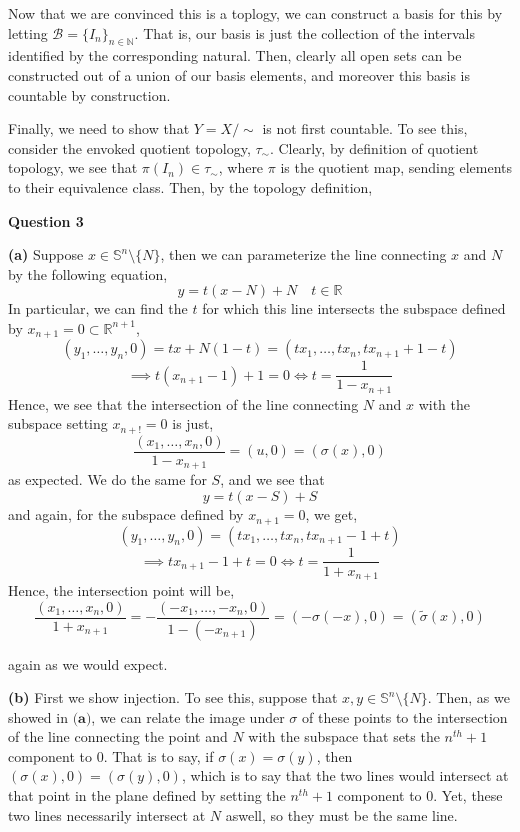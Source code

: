 \documentclass[10pt]{article}
\newcommand{\R}{\mathbb{R}}
\newcommand{\N}{\mathbb{N}}
\newcommand{\Sp}{\mathbb{S}}
\begin{document}
Now that we are convinced this is a toplogy, we can construct a basis for this by letting $\mathcal{B} = \{I_{n}\}_{n\in \N}$. That is, our basis is just the collection of the intervals identified by the corresponding natural. Then, clearly all open sets can be constructed out of a union of our basis elements, and moreover this basis is countable by construction.

Finally, we need to show that $Y = X/\sim$ is not first countable. To see this, consider the envoked quotient topology, $\tau_{\sim}$. Clearly, by definition of quotient topology, we see that $\pi (I_{n}) \in \tau_{\sim}$, where $\pi$ is the quotient map, sending elements to their equivalence class. Then, by the topology definition, 
\newpage

\textbf{Question 3}

\textbf{(a)} Suppose $x\in \Sp^{n}\setminus \{N\}$, then we can parameterize the line connecting $x$ and $N$ by the following equation,
$$y = t(x-N)+ N \hspace{1em} t\in \R$$
In particular, we can find the $t$ for which this line intersects the subspace defined by $x_{n+1} = 0 \subset \R^{n+1}$,
$$(y_{1}, \dots, y_{n}, 0) = tx + N(1-t) = (tx_{1}, \dots, tx_{n}, tx_{n+1} + 1 - t)$$
$$ \implies t(x_{n+1} - 1) + 1 = 0 \iff t = \frac{1}{1-x_{n+1}}$$
Hence, we see that the intersection of the line connecting $N$ and $x$ with the subspace setting $x_{n+!} = 0$ is just,
$$\frac{(x_{1},\dots,x_{n},0)}{1-x_{n+1}} = (u,0) = (\sigma(x),0) $$
as expected. We do the same for $S$, and we see that
$$y = t(x-S) + S$$
and again, for the subspace defined by $x_{n+1}= 0$, we get,
$$ (y_{1}, \dots, y_{n}, 0) = (tx_{1},\dots,tx_{n},tx_{n+1} -1 +t)$$
$$ \implies tx_{n+1} -1 +t = 0 \iff t = \frac{1}{1 + x_{n+1}}$$
Hence, the intersection point will be,
$$\frac{(x_{1},\dots,x_{n},0)}{1+x_{n+1}} = -\frac{(-x_{1},\dots,-x_{n},0)}{1-(-x_{n+1})} = (-\sigma(-x),0) = (\tilde{\sigma}(x),0)$$

again as we would expect.

\textbf{(b)} First we show injection. To see this, suppose that $x,y \in \Sp^{n}\setminus \{N\}$. Then, as we showed in $\textbf{(a)}$, we can relate the image under $\sigma$ of these points to the intersection of the line connecting the point and $N$ with the subspace that sets the $n^{th}+1$ component to 0. That is to say, if $\sigma(x) = \sigma(y)$, then $(\sigma(x),0) = (\sigma(y),0)$, which is to say that the two lines would intersect at that point in the plane defined by setting the $n^{th}+1$ component to 0. Yet, these two lines necessarily intersect at $N$ aswell, so they must be the same line.
\end{document}
